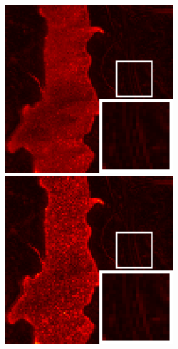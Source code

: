 \begin{figure}[t]
\begin{center}
\begin{minipage}{0.15\hsize}
		\end{minipage}
		\begin{minipage}{0.15\hsize}
			\centerline{\includegraphics[width=\hsize]{./fig_supplement/SAM_map_color_woboundary/JasperRidge/sam_map_HSSTV_L12.eps}} %
		\end{minipage}
		\begin{minipage}{0.15\hsize}
			\centerline{\includegraphics[width=\hsize]{./fig_supplement/SAM_map_color_woboundary/JasperRidge/sam_map_l0l1HTV.eps}} %

\end{minipage}
\end{center}
\end{figure}
